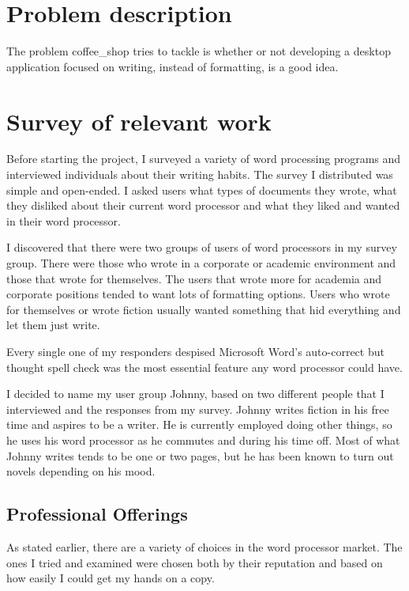 \documentclass[10pt]{article}
\begin{document}
\section{Problem description}

The problem coffee\_shop tries to tackle is whether or not developing a desktop application focused on writing, instead of formatting, is a good idea.

\section{Survey of relevant work}

Before starting the project, I surveyed a variety of word processing programs and interviewed individuals about their writing habits. The survey I distributed was simple and open-ended. I asked users what types of documents they wrote, what they disliked about their current word processor and what they liked and wanted in their word processor.

I discovered that there were two groups of users of word processors in my survey group. There were those who wrote in a corporate or academic environment and those that wrote for themselves. The users that wrote more for academia and corporate positions tended to want lots of formatting options. Users who wrote for themselves or wrote fiction usually wanted something that hid everything and let them just write.

Every single one of my responders despised Microsoft Word's auto-correct but thought spell check was the most essential feature any word processor could have.

I decided to name my user group Johnny, based on two different people that I interviewed and the responses from my survey. Johnny writes fiction in his free time and aspires to be a writer. He is currently employed doing other things, so he uses his word processor as he commutes and during his time off. Most of what Johnny writes tends to be one or two pages, but he has been known to turn out novels depending on his mood.

\subsection{Professional Offerings}

As stated earlier, there are a variety of choices in the word processor market. The ones I tried and examined were chosen both by their reputation and based on how easily I could get my hands on a copy.
\end{document}
